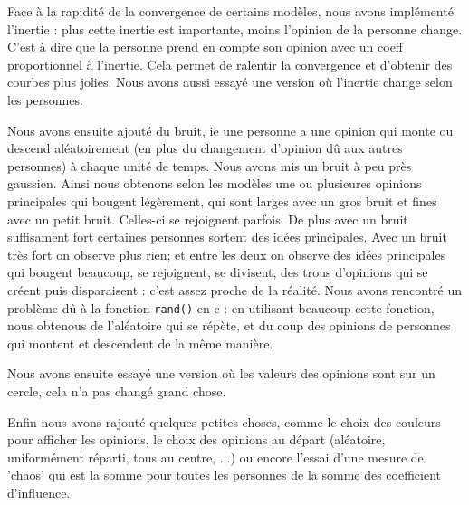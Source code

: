 \documentclass[a4paper,10pt]{article}
\begin{document}
Face à la rapidité de la convergence de certains modèles, nous avons implé\-men\-té l'inertie : plus cette inertie est importante, moins l'opinion de la personne change. C'est à dire que la personne prend en compte son opinion avec un coeff proportionnel à l'inertie. Cela permet de ralentir la convergence et d'obtenir des courbes plus jolies.
Nous avons aussi essayé une version où l'inertie change selon les personnes.

Nous avons ensuite ajouté du bruit, ie une personne a une opinion qui monte ou descend aléatoirement (en plus du changement d'opinion dû aux autres personnes) à chaque unité de temps. Nous avons mis un bruit à peu près gaussien. Ainsi nous obtenons selon les modèles une ou plusieures opinions principales qui bougent légèrement, qui sont larges avec un gros bruit et fines avec un petit bruit. Celles-ci se rejoignent parfois. De plus avec un bruit suffisament fort certaines personnes sortent des idées principales. Avec un bruit très fort on observe plus rien; et entre les deux on observe des idées principales qui bougent beaucoup, se rejoignent, se divisent, des trous d'opinions qui se créent puis disparaisent : c'est assez proche de la réalité.
Nous avons rencontré un problème dû à la fonction \texttt{rand()} en c : en utilisant beaucoup cette fonction, nous obtenous de l'aléatoire qui se répète, et du coup des opinions de personnes qui montent et descendent de la même manière.

Nous avons ensuite essayé une version où les valeurs des opinions sont sur un cercle, cela n'a pas changé grand chose.

Enfin nous avons rajouté quelques petites choses, comme le choix des couleurs pour afficher les opinions, le choix des opinions au départ (aléatoire, uniformément réparti, tous au centre, ...) ou encore l'essai d'une mesure de 'chaos' qui est la somme pour toutes les personnes de la somme des coefficient d'influence.
\end{document}
